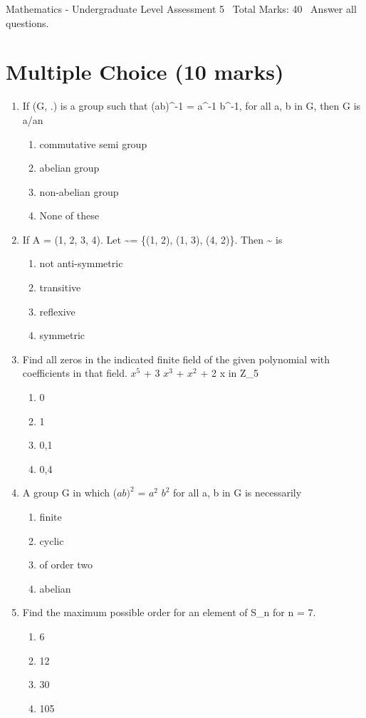 \documentclass[12pt]{article}
\begin{document}
\begin{center}
Mathematics - Undergraduate Level Assessment 5 \
Total Marks: 40 \
Answer all questions.
\end{center}

\section*{Multiple Choice (10 marks)}
\begin{enumerate}[label=\arabic*.]
\item If (G, .) is a group such that (ab)^-1 = a^-1 b^-1, for all a, b in G, then G is a/an
\begin{enumerate}[label=(\alph*)]
    \item commutative semi group
    \item abelian group
    \item non-abelian group
    \item None of these
\end{enumerate}
\item If A = (1, 2, 3, 4). Let \textasciitilde{}= \{(1, 2), (1, 3), (4, 2)\}. Then \textasciitilde{} is
\begin{enumerate}[label=(\alph*)]
    \item not anti-symmetric
    \item transitive
    \item reflexive
    \item symmetric
\end{enumerate}
\item Find all zeros in the indicated finite field of the given polynomial with coefficients in that field. $x^5$ + 3 $x^3$ + $x^2$ + 2 x in Z\_5
\begin{enumerate}[label=(\alph*)]
    \item 0
    \item 1
    \item 0,1
    \item 0,4
\end{enumerate}
\item A group G in which ($ab)^2$ = $a^2$ $b^2$ for all a, b in G is necessarily
\begin{enumerate}[label=(\alph*)]
    \item finite
    \item cyclic
    \item of order two
    \item abelian
\end{enumerate}
\item Find the maximum possible order for an element of S\_n for n = 7.
\begin{enumerate}[label=(\alph*)]
    \item 6
    \item 12
    \item 30
    \item 105
\end{enumerate}
\end{enumerate}
\end{document}
